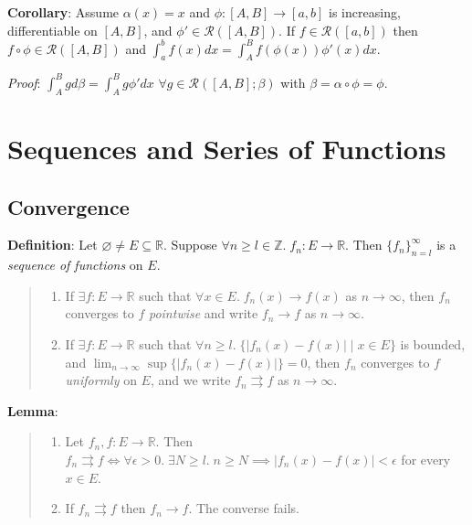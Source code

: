 \documentclass[11pt]{article}
\begin{document}
\textbf{Corollary}: Assume $\alpha(x) = x$ and $\phi : [A,B] \to [a,b]$ is increasing, differentiable on $[A,B]$, and $\phi' \in \mathcal{R}([A,B])$. If $f \in \mathcal{R}([a,b])$ then $f \circ \phi \in \mathcal{R}([A,B])$ and $\int_a^b f(x) dx = \int_A^B f(\phi(x)) \phi'(x) dx$.

\emph{Proof}: $\int_A^B g d\beta = \int_A^B g \phi' dx$ $\forall g \in \mathcal{R}([A,B]; \beta)$ with $\beta = \alpha \circ \phi = \phi$.

\section{Sequences and Series of Functions}

\subsection{Convergence}

\textbf{Definition}: Let $\varnothing \neq E \subseteq \mathbb{R}$. Suppose $\forall n \geq l \in \mathbb{Z}.\; f_n : E \to \mathbb{R}$. Then $\{f_n\}_{n=l}^\infty$ is a \emph{sequence of functions} on $E$.
\begin{quote}\vspace{-0.3cm}
	\begin{enumerate}
	\item If $\exists f : E \to \mathbb{R}$ such that $\forall x \in E.\; f_n(x) \to f(x)$ as $n \to \infty$, then $f_n$ converges to $f$ \emph{pointwise} and write $f_n \to f$ as $n \to \infty$.
	\item If $\exists f : E \to \mathbb{R}$ such that $\forall n \geq l.\; \{|f_n(x) - f(x)| \mid x \in E\}$ is bounded, and $\lim_{n \to \infty} \sup \{|f_n(x) - f(x)|\} = 0$, then $f_n$ converges to $f$ \emph{uniformly} on $E$, and we write $f_n \rightrightarrows f$ as $n \to \infty$.
	\end{enumerate}
\end{quote}

\textbf{Lemma}:
\begin{quote}\vspace{-0.3cm}
	\begin{enumerate}
	\item Let $f_n, f : E \to \mathbb{R}$. Then \\$f_n \rightrightarrows f \iff \forall \epsilon > 0.\; \exists N \geq l.\; n \geq N \implies |f_n(x) - f(x)| < \epsilon$ for every $x \in E$.
	\item If $f_n \rightrightarrows f$ then $f_n \to f$. The converse fails.
	\end{enumerate}
\end{quote}
\end{document}
